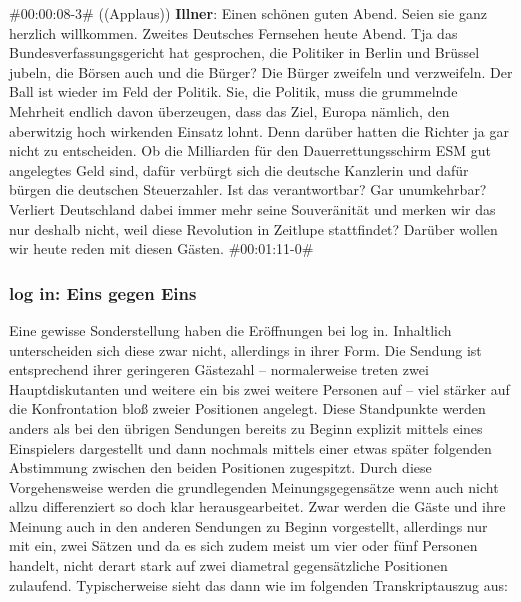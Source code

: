 \begin{description}
	\begin{linenumbers}[1]
		\item \#00:00:08-3\# ((Applaus)) \textbf{Illner}: Einen schönen guten Abend. Seien sie ganz herzlich willkommen. Zweites Deutsches Fernsehen heute Abend. Tja das Bundesverfassungsgericht hat gesprochen, die Politiker in Berlin und Brüssel jubeln, die Börsen auch und die Bürger? Die Bürger zweifeln und verzweifeln. Der Ball ist wieder im Feld der Politik. Sie, die Politik, muss die grummelnde Mehrheit endlich davon überzeugen, dass das Ziel, Europa nämlich, den aberwitzig hoch wirkenden Einsatz lohnt. Denn darüber hatten die Richter ja gar nicht zu entscheiden. Ob die Milliarden für den Dauerrettungsschirm ESM gut angelegtes Geld sind, dafür verbürgt sich die deutsche Kanzlerin und dafür bürgen die deutschen Steuerzahler. Ist das verantwortbar? Gar unumkehrbar? Verliert Deutschland dabei immer mehr seine Souveränität und merken wir das nur deshalb nicht, weil diese Revolution in Zeitlupe stattfindet? Darüber wollen wir heute reden mit diesen Gästen. \#00:01:11-0\#
	\end{linenumbers}
\end{description}

\subsubsection{log in: Eins gegen Eins}

Eine gewisse Sonderstellung haben die Eröffnungen bei log in. Inhaltlich unterscheiden  sich diese zwar nicht, allerdings in ihrer Form. Die Sendung ist entsprechend ihrer  geringeren Gästezahl – normalerweise treten zwei Hauptdiskutanten und weitere ein bis zwei weitere Personen auf – viel stärker auf die Konfrontation bloß zweier Positionen angelegt. Diese Standpunkte werden anders als bei den übrigen Sendungen bereits zu Beginn explizit mittels eines Einspielers dargestellt und dann nochmals mittels einer etwas später folgenden Abstimmung zwischen den beiden Positionen zugespitzt. Durch diese Vorgehensweise werden die grundlegenden Meinungsgegensätze wenn auch nicht allzu differenziert so doch klar herausgearbeitet. Zwar werden die Gäste und ihre Meinung auch in den anderen Sendungen zu Beginn vorgestellt, allerdings nur mit ein, zwei Sätzen und da es sich zudem meist um vier oder fünf Personen handelt, nicht derart stark auf zwei diametral gegensätzliche Positionen zulaufend. Typischerweise sieht das dann wie im folgenden Transkriptauszug aus:

